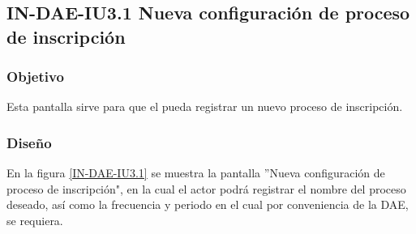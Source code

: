 \subsection{IN-DAE-IU3.1 Nueva configuración de proceso de inscripción}

\subsubsection{Objetivo}
	
	Esta pantalla sirve para que el  pueda registrar un nuevo proceso de inscripción.

\subsubsection{Diseño}

    En la figura \ref{IN-DAE-IU3.1} se muestra la pantalla ''Nueva configuración de proceso de inscripción", en la cual el actor podrá registrar el nombre del proceso deseado, así como la frecuencia y periodo en el cual por conveniencia de la DAE, se requiera.
            

